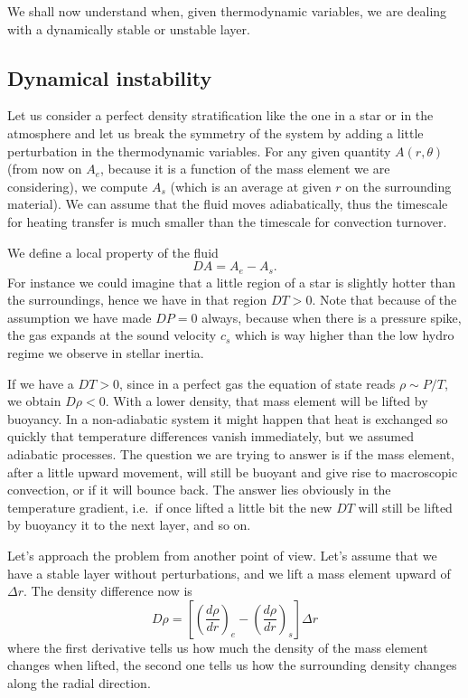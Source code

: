 We shall now understand when, given thermodynamic variables, we are dealing with a dynamically stable or unstable layer.


\subsection{Dynamical instability}
Let us consider a perfect density stratification like the one in a star or in the atmosphere and let us break the symmetry of the system by adding a little perturbation in the thermodynamic variables. For any given quantity $A(r, \theta)$ (from now on $A_e$, because it is a function of the mass element we are considering), we compute $A_s$ (which is an average at given $r$ on the surrounding material). We can assume that the fluid moves adiabatically, thus the timescale for heating transfer is much smaller than the timescale for convection turnover. 

We define a local property of the fluid 
$$
DA=A_e - A_s.
$$
For instance we could imagine that a little region of a star is slightly hotter than the surroundings, hence we have in that region $DT > 0$. Note that because of the assumption we have made $DP=0$ always, because when there is a pressure spike, the gas expands at the sound velocity $c_s$ which is way higher than the low hydro regime we observe in stellar inertia.

If we have a $DT>0$, since in a perfect gas the equation of state reads $\rho \sim P/T$, we obtain $D \rho < 0$. With a lower density, that mass element will be lifted by buoyancy. In a non-adiabatic system it might happen that heat is exchanged so quickly that temperature differences vanish immediately, but we assumed adiabatic processes. The question we are trying to answer is if the mass element, after a little upward movement, will still be buoyant and give rise to macroscopic convection, or if it will bounce back. The answer lies obviously in the temperature gradient, i.e.\ if once lifted a little bit the new $DT$ will still be lifted by buoyancy it to the next layer, and so on. 

Let's approach the problem from another point of view. Let's assume that we have a stable layer without perturbations, and we lift a mass element upward of $\Delta r$. The density difference now is
\begin{equation}\label{eq:displacement}
D \rho = \left [  \left( \frac{d \rho}{d r} \right)_e - \left( \frac{d \rho}{d r} \right)_s   \right ] \Delta r
\end{equation}
where the first derivative tells us how much the density of the mass element changes when lifted, the second one tells us how the surrounding density changes along the radial direction. 

